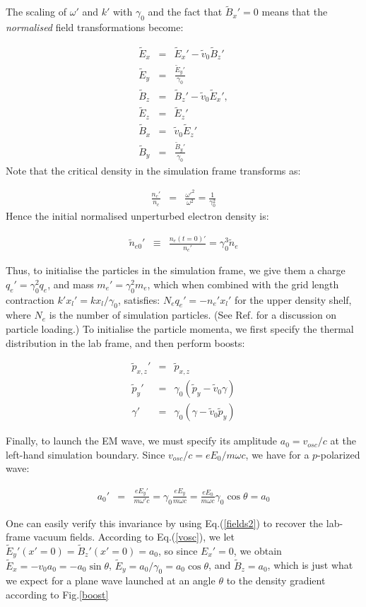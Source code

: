 \documentclass[11pt]{article}
\def\bea{\begin{eqnarray}}
\def\eea{\end{eqnarray}}
\begin{document}
The scaling of $\omega'$ and $k'$ with $\gamma_0$ and the fact that $\tilde{B}_x'=0$ means that the {\em
normalised} field transformations become:

\bea
\tilde{E}_x & = & \tilde{E}_x' - \tilde{v}_0\tilde{B}_z' \nonumber \\
\tilde{E}_y & = & \frac{\tilde{E}_y'}{\gamma_0} \nonumber \\
\tilde{B}_z & = & \tilde{B}_z' - \tilde{v}_0\tilde{E}_x', \nonumber\\
\tilde{E}_z & = & \tilde{E}_z'  \nonumber\\
\tilde{B}_x & = & \tilde{v}_0\tilde{E}_z' \nonumber \\
\tilde{B}_y & = & \frac{\tilde{B}_y'}{\gamma_0} \label{fields2} 
\eea
%
Note that the critical density in the simulation frame transforms as:

\bea 
\frac{n_c'}{n_c} & = & \frac{\omega '^2}{\omega^2} = \frac{1}{\gamma_0^2} \nonumber 
\eea
%
Hence the initial normalised unperturbed electron density is:

\bea
\tilde{n}_{e0}' & \equiv & \frac{n_e(t=0)'}{n_c'} = \gamma_0^3\tilde{n}_e \nonumber
\eea

Thus, to initialise the particles in the simulation frame, we give them a
charge $q_e' = \gamma_0^2 q_e$, and mass $m_e' = \gamma_0^2 m_e$, which
when combined with the grid length contraction $k'x_l'= kx_l/\gamma_0$, satisfies: $N_e q_e' = -n_e'x_l'$ for the upper density shelf, where $N_e$ is the number of simulation particles. (See Ref.\cite{birdsall:book} for
a discussion on particle loading.)  To initialise the particle momenta,
we first specify the thermal distribution in the lab frame, and then 
perform boosts:

\bea
\tilde{p}_{x,z}' & = & \tilde{p}_{x,z} \nonumber \\
\tilde{p}_y' & = & \gamma_0(\tilde{p}_y - \tilde{v}_0\gamma) \nonumber \\
\gamma' & = & \gamma_0(\gamma - \tilde{v}_0\tilde{p}_y) \label{m_boost} 
\eea

Finally, to launch the EM wave, we must specify its amplitude 
$a_0 =v_{osc}/c$ at the left-hand simulation boundary.  
Since $v_{osc}/c = eE_0/m\omega c$, we have for a $p$-polarized wave:

\bea
a_0' & = & \frac{eE_y'}{m\omega' c} = \gamma_0\frac{eE_y}{m\omega c}
= \frac{eE_0}{m\omega c}\gamma_0\cos\theta = a_0 \label{vosc} 
\eea

One can easily verify this invariance by using Eq.(\ref{fields2}) to 
recover the lab-frame vacuum fields.  According to Eq.(\ref{vosc}), we let $\tilde{E}_y'(x'=0) = \tilde{B}_z'(x'=0) = a_0$, so since $E_x'= 0$, we obtain
$\tilde{E}_x = -v_0a_0 = -a_0\sin\theta$, $\tilde{E}_y = a_0/\gamma_0 = a_0\cos\theta$, and $\tilde{B}_z = a_0$, which is just what we 
expect for a plane wave launched at an angle $\theta$ to the density 
gradient according to Fig.\ref{boost}
\end{document}
